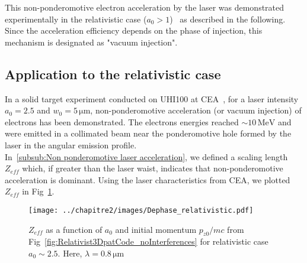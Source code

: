 This non-ponderomotive electron acceleration by the laser was demonstrated experimentally in the relativistic case ($a_0 > 1$)~\cite{thevenet2015} as described in the following. Since the acceleration efficiency depends on the phase of injection, this mechanism is designated as "vacuum injection".\\


\subsection{Application to the relativistic case}

In a solid target experiment conducted on UHI100 at CEA~\cite{thevenet2015}, for a laser intensity $a_0 = 2.5$ and $w_0 = 5\,\mathrm{\mu m}$, non-ponderomotive acceleration (or vacuum injection) of electrons has been demonstrated. The electrons energies reached $\sim 10\,\mathrm{MeV}$ and were emitted in a collimated beam near the ponderomotive hole formed by the laser in the angular emission profile.\\

In~\ref{subsub:Non ponderomotive laser acceleration}, we defined a scaling length $Z_{eff}$ which, if greater than the laser waist, indicates that non-ponderomotive acceleration is dominant. Using the laser characteristics from CEA, we plotted $Z_{eff}$ in Fig~\ref{fig:Dephase_relativistic}.

\begin{figure}[H]
\begin{center}
\texttt{[image: ../chapitre2/images/Dephase\_relativistic.pdf]}
\end{center}
\caption{\label{fig:Dephase_relativistic} $Z_{eff}$ as a function of $a_0$ and initial momentum $p_{z0}/mc$ from Fig~\ref{fig:Relativist3DpatCode_noInterferences} for relativistic case $a_0 \sim 2.5$. Here, $\lambda = 0.8\,\mathrm{\mu m}$}
\end{figure}


